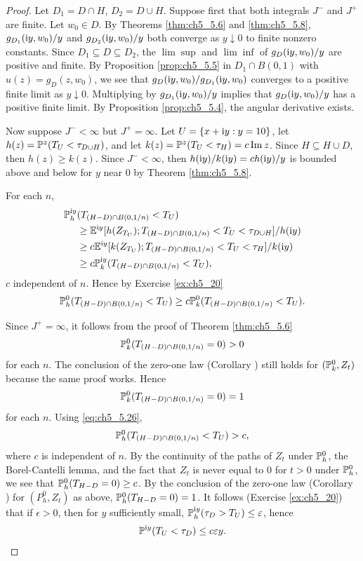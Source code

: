 \begin{proof}
Let $D_1 = D \cap H$, $D_2 = D \cup H$. Suppose first that both integrals $J^-$ and $J^+$ are finite. Let $w_0 \in D$. By Theorems \ref{thm:ch5_5.6} and \ref{thm:ch5_5.8}, $g_{D_1}(\im y,w_0)/y$ and $g_{D_2}(\im y,w_0)/y$ both converge as $y \downarrow 0$ to finite nonzero constants. Since $D_1 \subseteq D \subseteq D_2$, the $\lim \sup$ and $\lim \inf$ of $g_D(\im y,w_0)/y$ are positive and finite. By Proposition \ref{prop:ch5_5.5} in $D_1 \cap B(0,1)$ with $u(z) = g_D(z,w_0)$, we see that $g_D(\im y,w_0)/g_{D_1}(\im y,w_0)$ converges to a positive finite limit as $y \downarrow 0$. Multiplying by $g_{D_1}(\im y,w_0)/y$ implies that $g_D(\im y,w_0)/y$ has a positive finite limit. By Proposition \ref{prop:ch5_5.4}, the angular derivative exists.

Now suppose $J^- < \infty$ but $J^+ = \infty$. Let $U = \{x + \im y : y = 10\}$, let $h(z) = \P^z(T_U < \tau_{D \cup H})$, and let $k(z) = \P^z(T_U < \tau_H) = c\Im z$. Since $H \subseteq H \cup D$, then $h(z) \geq k(z)$. Since $J^- < \infty$, then $h(\im y)/k(\im y) = ch(\im y)/y$ is bounded above and below for $y$ near $0$ by Theorem \ref{thm:ch5_5.8}.

For each $n$,
\mpagebreak
\begin{align*}
    \P_h^{\im y}&(T_{(H-D) \cap B(0,1/n)} < T_U) \\
    &\geq \E^{\im y}[h(Z_{T_U}); T_{(H-D) \cap B(0,1/n)} < T_U < \tau_{D \cup H}]/h(\im y) \\
    &\geq c\E^{\im y}[k(Z_{T_U}); T_{(H-D) \cap B(0,1/n)} < T_U < \tau_H]/k(\im y) \\
    &\geq c\P_k^{\im y}(T_{(H-D) \cap B(0,1/n)} < T_U),
\end{align*}
$c$ independent of $n$. Hence by Exercise \ref{ex:ch5_20}
\begin{equation}\label{eq:ch5_5.26}
    \P_h^0(T_{(H-D) \cap B(0,1/n)} < T_U) \geq c\P_k^0(T_{(H-D) \cap B(0,1/n)} < T_U).
\end{equation}

Since $J^+ = \infty$, it follows from the proof of Theorem \ref{thm:ch5_5.6}
\[
    \P_k^0(T_{(H-D) \cap B(0,1/n)} = 0) > 0
\]
for each $n$. The conclusion of the zero-one law (Corollary ) still holds for $(\P_k^0,Z_t)$ because the same proof works. Hence
\[
    \P_k^0(T_{(H-D) \cap B(0,1/n)} = 0) =1
\]
for each $n$. Using \eqref{eq:ch5_5.26},
\[
    \P_h^0(T_{(H-D) \cap B(0,1/n)} < T_U) > c,
\]
where $c$ is independent of $n$. By the continuity of the paths of $Z_t$ under $\P_h^0$, the Borel-Cantelli lemma, and the fact that $Z_t$ is never equal to $0$ for $t > 0$ under $\P_h^0$, we see that $\P_h^0(T_{H-D} = 0) \geq c$. By the conclusion of the zero-one law (Corollary ) for $(P_h^0,Z_t)$ as above, $\P_h^0(T_{H-D} = 0) = 1$. It follows (Exercise \ref{ex:ch5_20}) that if $\epsilon > 0$, then for $y$ sufficiently small, $\P_h^{\im y}(\tau_D > T_U) \leq \epsilon$, hence
\[
    \P^{\im y}(T_U < \tau_D)\leq c\epsilon y.
\]


\end{proof}
